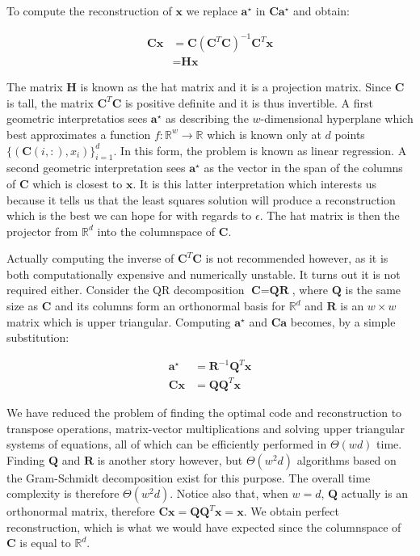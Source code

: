 \documentclass[12pt,a4paper,oneside,english]{UPBThesis}
\newcommand{\hctimes}[2]{{#1}\!\times\!{#2}}
\newcommand{\hcsignalspace}{\mathbb{R}^d}
\newcommand{\hcweightspace}{\mathbb{R}^w}
\begin{document}
To compute the reconstruction of $\textbf{x}$ we replace $\textbf{a}^\star$ in $\textbf{C}\textbf{a}^\star$ and obtain:

\begin{align*}
\textbf{C}\textbf{x} & = \textbf{C}{\left( \textbf{C}^T\textbf{C} \right)}^{-1} \textbf{C}^T\textbf{x} \\
& = \textbf{H}\textbf{x}
\end{align*}

The matrix $\textbf{H}$ is known as the hat matrix and it is a projection matrix. Since $\textbf{C}$ is tall, the matrix $\textbf{C}^T\textbf{C}$ is positive definite and it is thus invertible. A first geometric interpretatios sees $\textbf{a}^\star$ as describing the $w$-dimensional hyperplane which best approximates a function $f:\hcweightspace \rightarrow \mathbb{R}$ which is known only at $d$ points $\{(\textbf{C}(i,:),x_i)\}_{i=1}^d$. In this form, the problem is known as linear regression. A second geometric interpretation sees $\textbf{a}^\star$ as the vector in the span of the columns of $\textbf{C}$ which is closest to $\textbf{x}$. It is this latter interpretation which interests us because it tells us that the least squares solution will produce a reconstruction which is the best we can hope for with regards to $\epsilon$. The hat matrix is then the projector from $\hcsignalspace$ into the columnspace of $\textbf{C}$.

Actually computing the inverse of $\textbf{C}^T\textbf{C}$ is not recommended however, as it is both computationally expensive and numerically unstable. It turns out it is not required either. Consider the QR decomposition $\textbf{C} = \textbf{Q}\textbf{R}$, where $\textbf{Q}$ is the same size as $\textbf{C}$ and its columns form an orthonormal basis for $\hcsignalspace$ and $\textbf{R}$ is an $\hctimes{w}{w}$ matrix which is upper triangular. Computing $\textbf{a}^\star$ and $\textbf{C}\textbf{a}$ becomes, by a simple substitution:

\begin{align*}
\textbf{a}^\star & = \textbf{R}^{-1}\textbf{Q}^T\textbf{x} \\
\textbf{C}\textbf{x} & = \textbf{Q}\textbf{Q}^T\textbf{x}
\end{align*}

We have reduced the problem of finding the optimal code and reconstruction to transpose operations, matrix-vector multiplications and solving upper triangular systems of equations, all of which can be efficiently performed in $\Theta(wd)$ time. Finding $\textbf{Q}$ and $\textbf{R}$ is another story however, but $\Theta(w^2d)$ algorithms based on the Gram-Schmidt decomposition exist for this purpose. The overall time complexity is therefore $\Theta(w^2d)$. Notice also that, when $w = d$, $\textbf{Q}$ actually is an orthonormal matrix, therefore $\textbf{C}\textbf{x} = \textbf{Q}\textbf{Q}^T\textbf{x} = \textbf{x}$. We obtain perfect reconstruction, which is what we would have expected since the columnspace of $\textbf{C}$ is equal to $\hcsignalspace$.
\end{document}
